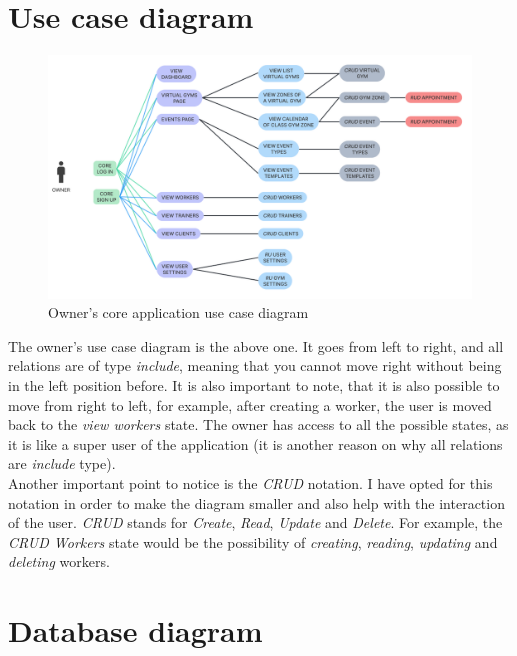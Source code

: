 \documentclass[a4paper, 12pt, oneside]{book}
\begin{document}
\section{Use case diagram}
\begin{figure}[H]
	\centering
	\includegraphics[width=\textwidth]{assets/use-case-diagrams/owner.png}
	\caption{Owner's core application use case diagram}
\end{figure}
The owner's use case diagram is the above one. It goes from left to right, and all relations are of type \emph{include}, meaning that you cannot move right without being in the left position before. It is also important to note, that it is also possible to move from right to left, for example, after creating a worker, the user is moved back to the \emph{view workers} state. The owner has access to all the possible states, as it is like a super user of the application (it is another reason on why all relations are \emph{include} type).
\\[8pt]
Another important point to notice is the \emph{CRUD} notation. I have opted for this notation in order to make the diagram smaller and also help with the interaction of the user. \emph{CRUD} stands for \emph{Create}, \emph{Read}, \emph{Update} and \emph{Delete}. For example, the \emph{CRUD Workers} state would be the possibility of \emph{creating}, \emph{reading}, \emph{updating} and \emph{deleting} workers. 
\section{Database diagram}
\end{document}
